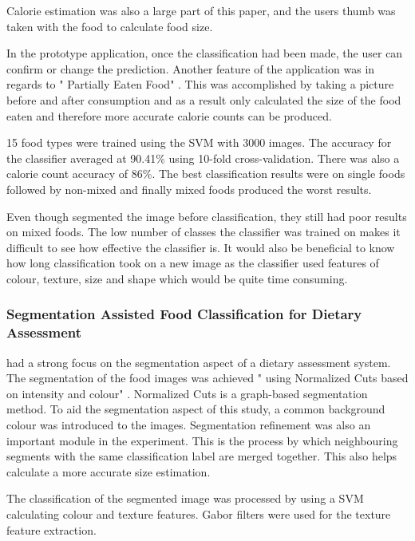 Calorie estimation was also a large part of this paper, and the users thumb was taken with the food to calculate food size.

In the prototype application, once the classification had been made, the user can confirm or change the prediction. Another feature of the application was in regards to " Partially Eaten Food" \parencite{pouladzadeh2014measuring}. This was accomplished by taking a picture before and after consumption and as a result only calculated the size of the food eaten and therefore more accurate calorie counts can be produced.

15 food types were trained using the SVM with 3000 images. The accuracy for the classifier averaged at 90.41\% using 10-fold cross-validation.
There was also a calorie count accuracy of 86\%. The best classification results were on single foods followed by non-mixed and finally mixed foods produced the worst results.

Even though \parencite{pouladzadeh2014measuring} segmented the image before classification, they still had poor results on mixed foods.
The low number of classes the classifier was trained on makes it difficult to see how effective the classifier is.
It would also be beneficial to know how long classification took on a new image as the classifier used features of colour, texture, size and shape which would be quite time consuming.

\subsubsection*{Segmentation Assisted Food Classification for Dietary Assessment}
\parencite{zhu2011segmentation} had a strong focus on the segmentation aspect of a dietary assessment system.
The segmentation of the food images was achieved " using Normalized Cuts based on intensity and colour" \parencite{zhu2011segmentation}.
Normalized Cuts is a graph-based segmentation method.
To aid the segmentation aspect of this study, a common background colour was introduced to the images.
Segmentation refinement was also an important module in the experiment.
This is the process by which neighbouring segments with  the same classification label are merged together.
This also helps calculate a more accurate size estimation.

The classification of the segmented image was processed by using a SVM calculating colour and texture features.
Gabor filters were used for the texture feature extraction.

